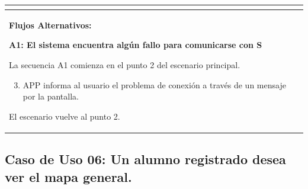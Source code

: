 \begin{longtable}{|l|p{5.5cm}|l|p{2cm}|l|p{1.9cm}|}
{    } \\ \hline

    \multicolumn{6}{|p{15cm}|}{ \textbf{Flujos Alternativos: }
    
    \textbf{A1: El sistema encuentra algún fallo para comunicarse con S}
    
    La secuencia A1 comienza en el punto 2 del escenario principal.
    \begin{enumerate}
        \setcounter{enumi}{2}
        \item APP informa al usuario el problema de conexión a través de un mensaje por la pantalla.
    \end{enumerate}

    El escenario vuelve al punto 2.

    } \\ \hline

\end{longtable}


\subsection{Caso de Uso 06: Un alumno registrado desea ver el mapa general.}

